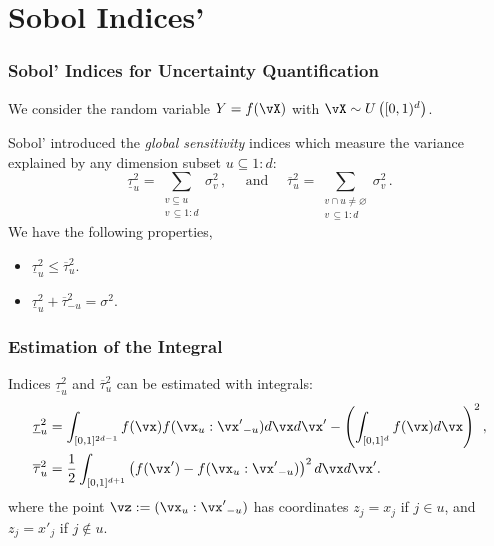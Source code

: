\documentclass[11pt,compress]{beamer} %
\begin{document}
\section{Sobol Indices'}

\begin{frame}
\frametitle{Sobol' Indices for Uncertainty Quantification}
We consider the random variable $Y=f(\vX)$ with $\vX\sim U\left([0,1)^d\right)$.

Sobol' introduced the \emph{global sensitivity} indices which measure the variance explained by any dimension subset $u\subseteq 1:d$:
\begin{equation*}
\underline{\tau}_u^2 = \sum_{\substack{v \subseteq u \\ v\,\subseteq 1:d}} \sigma_v^2\, , \quad \text{ and } \quad \overline{\tau}_u^2 = \sum_{\substack{v \cap u\neq\varnothing \\ v\,\subseteq 1:d}} \sigma_v^2\, .
\end{equation*}
We have the following properties,
\begin{itemize}
\item $\underline{\tau}_u^2\leq \overline{\tau}_u^2$.
\item $\underline{\tau}_u^2 + \overline{\tau}_{-u}^2 =\sigma^2$.
\end{itemize}
\end{frame}

\begin{frame}
\frametitle{Estimation of the Integral}
Indices $\underline{\tau}_u^2$ and $\overline{\tau}_u^2$ can be estimated with integrals:
\begin{align*}
\underline{\tau}_u^2  &= \int_{[0,1]^{2d-1}} f(\vx)f(\vx_{u}:{\vx'}_{-u})d\vx d{\vx'} - \left(\int_{[0,1]^d}f(\vx) d\vx\right)^2, \\
\overline{\tau}_u^2 &= \frac{1}{2}\int_{[0,1]^{d+1}}\left(f(\vx')-f(\vx_u:{\vx'}_{-u})\right)^2 d\vx d{\vx'}.
\end{align*}
where the point $\vz := (\vx_u:{\vx'}_{-u})$ has coordinates $z_j=x_j$ if $j\in u$, and $z_j={x'}_j$ if $j\notin u$.

\end{frame}
\end{document}
